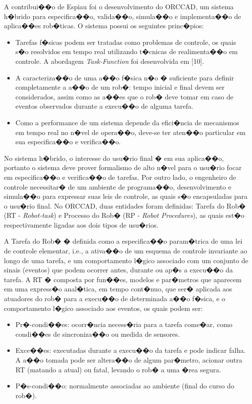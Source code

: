 A contribui��o de Espiau foi o desenvolvimento do ORCCAD, um sistema h�brido
para especifica��o, valida��o, simula��o e implementa��o de aplica��es
rob�ticas. O sistema possui os seguintes princ�pios:

\begin{itemize}
  \item Tarefas f�sicas podem ser tratadas como problemas de controle, os quais
  s�o resolvidos em tempo real utilizando t�cnicas de realimenta��o em controle.
  A abordagem \emph{Task-Function} foi desenvolvida em [10].
  \item A caracteriza��o de uma a��o f�sica n�o � suficiente para definir
  completamente a a��o de um rob�: tempo inicial e final devem ser considerados,
  assim como as a��es que o rob� deve tomar em caso de eventos observados
  durante a execu��o de alguma tarefa.
  \item Como a performance de um sistema depende da efici�ncia de mecanismos em
  tempo real no n�vel de opera��o, deve-se ter aten��o particular em sua
  especifica��o e verifica��o.
\end{itemize}

No sistema h�brido, o interesse do usu�rio final � em sua aplica��o, portanto
o sistema deve prover formalismo de alto n�vel para o usu�rio focar em
especifica��o e verifica��o de tarefas. Por outro lado, o engenheiro
de controle necessitar� de um ambiente de programa��o, desenvolvimento e
simula��o para expressar suas leis de controle, as quais s�o encapsuladas para
o usu�rio final. No ORCCAD, duas entidades foram definidas: Tarefa do Rob� (RT
- \emph{Robot-task}) e Processo do Rob� (RP - \emph{Robot Procedures}), as
quais est�o respectivamente ligadas aos dois tipos de usu�rios.

A Tarefa do Rob� � definida como a especifica��o param�trica de uma lei de
controle elementar, i.e., a ativa��o de um esquema de controle invariante ao
longo de uma tarefa, e um comportamento l�gico associado com um conjunto de
sinais (eventos) que podem ocorrer antes, durante ou ap�s a execu��o da tarefa.
A RT � composta por fun��es, modelos e par�metros que aparecem em uma express�o
anal�tica, em tempo cont�nuo, que ser� aplicada aos atuadores do rob� para a
execu��o de determinada a��o f�sica, e o comportamento l�gico associado aos
eventos, os quais podem ser:

\begin{itemize}
  \item Pr�-condi��es: ocorr�ncia necess�ria para a tarefa come�ar, como
  condi��es de sincroniza��o ou medida de sensores.
  \item Exce��es: executadas durante a execu��o da tarefa e pode indicar falha.
  A a��o tomada pode ser altera��o de algum par�metro, acionar outra RT
  (matando a atual) ou fatal, levando o rob� a uma �rea segura.
  \item P�s-condi��o: normalmente associadas ao ambiente (final do curso do
  rob�). 
\end{itemize}

